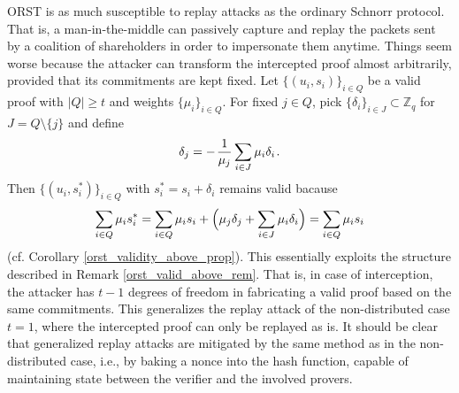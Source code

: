 \documentclass{iacrtrans}
\begin{document}
\textsf{ORST}
is as much susceptible to replay attacks
as the ordinary Schnorr protocol.
That is, a man-in-the-middle
can passively capture and replay
the packets sent by a coalition
of shareholders in order to impersonate them anytime.
Things seem worse
because the attacker can transform the
intercepted proof
almost arbitrarily,
provided that its commitments are kept fixed.
Let
$\{(u_i, s_i)\}_{i \in Q}$ be a
valid proof with $|Q| \ge t$ and weights $\{\mu_i\}_{i \in Q}$.
For fixed $j \in Q$,
pick $\{\delta_i\}_{i \in J} \subset \mathbb{Z}_q$
for $J = Q \setminus \{j\}$ and define
\vspace{5pt}
\begin{equation*}
\delta_j = -\hspace{1pt} \frac{1}{\mu_j}\sum_{i \in J} \mu_i \delta_i\hspace{1pt}.
\vspace{5pt}
\end{equation*}
Then $\{(u_i, s_i^*)\}_{i \in Q}$ with
$s_i^* = s_i + \delta_i$ remains valid bacause
\vspace{5pt}
\begin{equation*}
\sum_{i \in Q} \mu_i s_i^* =
\sum_{i \in Q} \mu_i s_i + \Big(\mu_j \delta_j + \sum_{i \in J} \mu_i \delta_i\Big) = 
\sum_{i \in Q} \mu_i s_i
\vspace{5pt}
\end{equation*}
\noindent
(cf. Corollary \ref{orst_validity_above_prop}).
This essentially exploits the structure described in
Remark \ref{orst_valid_above_rem}.
That is, in case of interception,
the attacker has $t-1$ degrees of freedom
in fabricating a valid proof based on the same commitments.
This generalizes the replay attack of the non-distributed
case $t=1$, where the intercepted proof can only be replayed as is.
It should be clear that
generalized replay attacks are
mitigated by the same method as in the non-distributed case,
i.e., by baking a nonce into the hash function,
capable of maintaining state between
the verifier and the involved provers.
\end{document}
